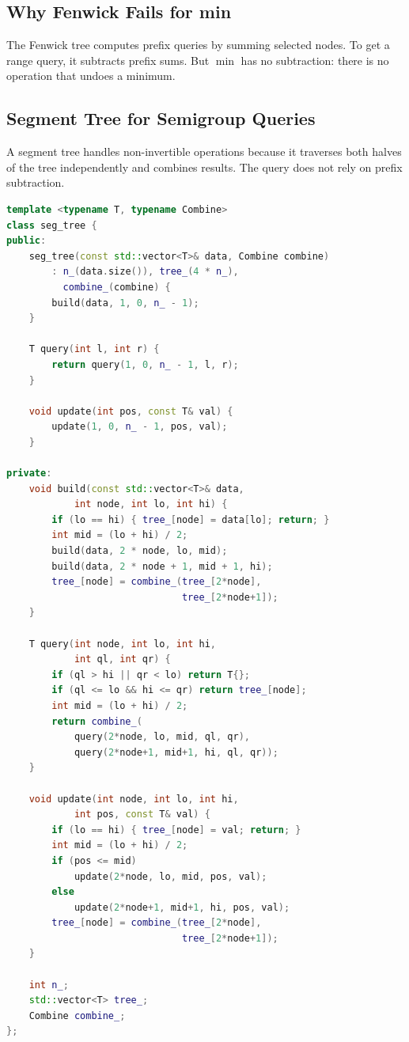 \subsection{Why Fenwick Fails for min}

The Fenwick tree computes prefix queries by summing selected nodes. To get a range query, it subtracts prefix sums. But $\min$ has no subtraction: there is no operation that undoes a minimum.

\subsection{Segment Tree for Semigroup Queries}

A segment tree handles non-invertible operations because it traverses both halves of the tree independently and combines results. The query does not rely on prefix subtraction.

\begin{lstlisting}[language=C++]
template <typename T, typename Combine>
class seg_tree {
public:
    seg_tree(const std::vector<T>& data, Combine combine)
        : n_(data.size()), tree_(4 * n_),
          combine_(combine) {
        build(data, 1, 0, n_ - 1);
    }

    T query(int l, int r) {
        return query(1, 0, n_ - 1, l, r);
    }

    void update(int pos, const T& val) {
        update(1, 0, n_ - 1, pos, val);
    }

private:
    void build(const std::vector<T>& data,
            int node, int lo, int hi) {
        if (lo == hi) { tree_[node] = data[lo]; return; }
        int mid = (lo + hi) / 2;
        build(data, 2 * node, lo, mid);
        build(data, 2 * node + 1, mid + 1, hi);
        tree_[node] = combine_(tree_[2*node],
                               tree_[2*node+1]);
    }

    T query(int node, int lo, int hi,
            int ql, int qr) {
        if (ql > hi || qr < lo) return T{};
        if (ql <= lo && hi <= qr) return tree_[node];
        int mid = (lo + hi) / 2;
        return combine_(
            query(2*node, lo, mid, ql, qr),
            query(2*node+1, mid+1, hi, ql, qr));
    }

    void update(int node, int lo, int hi,
            int pos, const T& val) {
        if (lo == hi) { tree_[node] = val; return; }
        int mid = (lo + hi) / 2;
        if (pos <= mid)
            update(2*node, lo, mid, pos, val);
        else
            update(2*node+1, mid+1, hi, pos, val);
        tree_[node] = combine_(tree_[2*node],
                               tree_[2*node+1]);
    }

    int n_;
    std::vector<T> tree_;
    Combine combine_;
};
\end{lstlisting}

